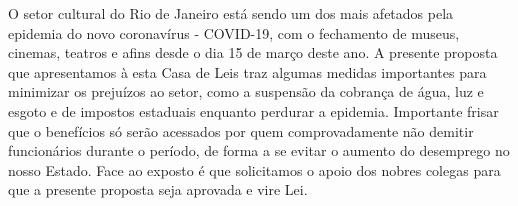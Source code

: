\documentclass[10pt]{article}
\begin{document}
  	O setor cultural do Rio de Janeiro está sendo um dos mais afetados pela epidemia do novo coronavírus - COVID-19, com o fechamento de museus, cinemas, teatros e afins desde o dia 15 de março deste ano.
	A presente proposta que apresentamos à esta Casa de Leis traz algumas medidas importantes para minimizar os prejuízos ao setor, como a suspensão da cobrança de água, luz e esgoto e de impostos estaduais enquanto perdurar a epidemia.
	Importante frisar que o benefícios só serão acessados por quem comprovadamente não demitir funcionários durante o período, de forma a se evitar o aumento do desemprego no nosso Estado.
	Face ao exposto é que solicitamos o apoio dos nobres colegas para que a presente proposta seja aprovada e vire Lei. 



\iffalse
\begin{center}
  \textbf{REFERÊNCIAS}
\end{center}


\fi
\end{document}
